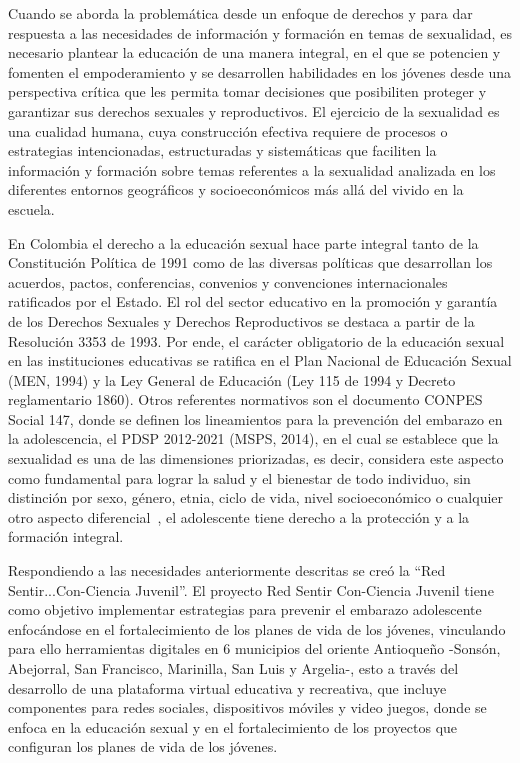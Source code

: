 \documentclass[journal,transmag]{IEEEtran}
\begin{document}
Cuando se aborda la problemática desde un enfoque de derechos y para dar respuesta a las necesidades de información y formación en temas de sexualidad, es necesario plantear la educación de una manera integral, en el que se potencien y fomenten el empoderamiento y se desarrollen habilidades en los jóvenes desde una perspectiva crítica que les permita tomar decisiones que posibiliten proteger y garantizar sus derechos sexuales y reproductivos. El ejercicio de la sexualidad es una cualidad humana, cuya construcción efectiva requiere de procesos o estrategias intencionadas, estructuradas y sistemáticas que faciliten la información y formación sobre temas referentes a la sexualidad analizada en los diferentes entornos geográficos y socioeconómicos más allá del vivido en la escuela.

En Colombia el derecho a la educación sexual hace parte integral tanto de la Constitución Política de 1991 como de las diversas políticas que desarrollan los acuerdos, pactos, conferencias, convenios y convenciones internacionales ratificados por el Estado. El rol del sector educativo en la promoción y garantía de los Derechos Sexuales y Derechos Reproductivos se destaca a partir de la Resolución 3353 de 1993. Por ende, el carácter obligatorio de la educación sexual en las instituciones educativas se ratifica en el Plan Nacional de Educación Sexual (MEN, 1994) y la Ley General de Educación (Ley  115  de 1994 y Decreto reglamentario 1860). Otros referentes normativos son el documento CONPES Social 147, donde se definen los lineamientos para la prevención del embarazo en la adolescencia, el PDSP 2012-2021 (MSPS, 2014), en el cual  se  establece que la sexualidad es una de las dimensiones priorizadas, es decir, considera este aspecto como fundamental para lograr la salud y el bienestar de todo individuo, sin distinción por sexo, género, etnia, ciclo de vida, nivel socioeconómico o cualquier otro aspecto diferencial~\cite{Pro2015II}, el adolescente tiene derecho a la protección y a la formación integral.

Respondiendo a las necesidades anteriormente descritas se creó la ``Red Sentir...Con-Ciencia Juvenil''. El proyecto Red Sentir Con-Ciencia Juvenil tiene como objetivo implementar estrategias para prevenir el embarazo adolescente enfocándose en el fortalecimiento de los planes de vida de los jóvenes, vinculando para ello herramientas digitales en 6 municipios del oriente Antioqueño -Sonsón, Abejorral, San Francisco, Marinilla, San Luis y Argelia-, esto a través del desarrollo de una plataforma virtual educativa y recreativa, que incluye componentes para redes sociales, dispositivos móviles y video juegos, donde se enfoca en la educación sexual y en el fortalecimiento de los proyectos que configuran los planes de vida de los jóvenes.
\end{document}
